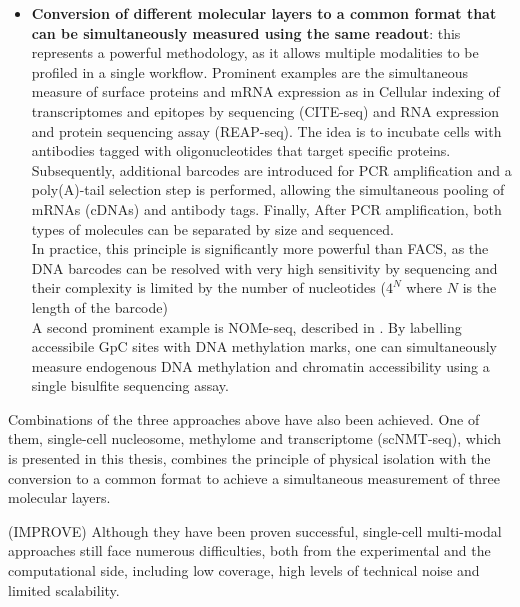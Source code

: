 \begin{itemize}
	\item \textbf{Conversion of different molecular layers to a common format that can be simultaneously measured using the same readout}: this represents a powerful methodology, as it allows multiple modalities to be profiled in a single workflow. Prominent examples are the simultaneous measure of surface proteins and mRNA expression as in Cellular indexing of transcriptomes and epitopes by sequencing (CITE-seq\cite{Stoeckius2017}) and RNA expression and protein sequencing assay (REAP-seq\cite{Peterson2017}). The idea is to incubate cells with antibodies tagged with oligonucleotides that target specific proteins. Subsequently, additional barcodes are introduced for PCR amplification and a poly(A)-tail selection step is performed, allowing the simultaneous pooling of mRNAs (cDNAs) and antibody tags. Finally, After PCR amplification, both types of molecules can be separated by size and sequenced.\\
	In practice, this principle is significantly more powerful than FACS, as the DNA barcodes can be resolved with very high sensitivity by sequencing and their complexity is limited by the number of nucleotides ($4^N$ where $N$ is the length of the barcode)\\
	A second prominent example is NOMe-seq, described in . By labelling accessibile GpC sites with DNA methylation marks, one can simultaneously measure endogenous DNA methylation and chromatin accessibility using a single bisulfite sequencing assay.
\end{itemize}

	
Combinations of the three approaches above have also been achieved. One of them, single-cell nucleosome, methylome and transcriptome (scNMT-seq\cite{Clark2018}), which is presented in this thesis, combines the principle of physical isolation with the conversion to a common format to achieve a simultaneous measurement of three molecular layers.

(IMPROVE) Although they have been proven successful, single-cell multi-modal approaches still face numerous difficulties, both from the experimental and the computational side, including low coverage, high levels of technical noise and limited scalability.

